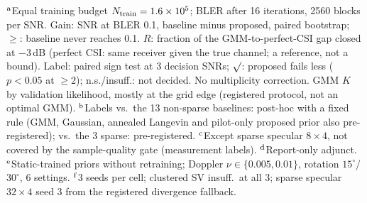 \begin{table}[!t]
\vspace{2pt}
\begin{minipage}{\columnwidth}
\scriptsize
$^{\rm a}$Equal training budget $N_{\rm train}=1.6\times10^5$; BLER after 16 iterations, 2560 blocks per SNR. Gain: SNR at BLER 0.1, baseline minus proposed, paired bootstrap; $\geq$: baseline never reaches 0.1. $R$: fraction of the GMM-to-perfect-CSI gap closed at $-3$\,dB (perfect CSI: same receiver given the true channel; a reference, not a bound). Label: paired sign test at 3 decision SNRs; $\surd$: proposed fails less ($p<0.05$ at $\geq2$); n.s./insuff.: not decided. No multiplicity correction. GMM $K$ by validation likelihood, mostly at the grid edge (registered protocol, not an optimal GMM).
$^{\rm b}$Labels vs.\ the 13 non-sparse baselines: post-hoc with a fixed rule (GMM, Gaussian, annealed Langevin and pilot-only proposed prior also pre-registered); vs.\ the 3 sparse: pre-registered.
$^{\rm c}$Except sparse specular $8\times4$, not covered by the sample-quality gate (measurement labels). $^{\rm d}$Report-only adjunct.
$^{\rm e}$Static-trained priors without retraining; Doppler $\nu\in\{0.005,0.01\}$, rotation $15^\circ$/$30^\circ$, 6 settings.
$^{\rm f}$3 seeds per cell; clustered SV insuff.\ at all 3; sparse specular $32\times4$ seed 3 from the registered divergence fallback.
\end{minipage}
\end{table}
